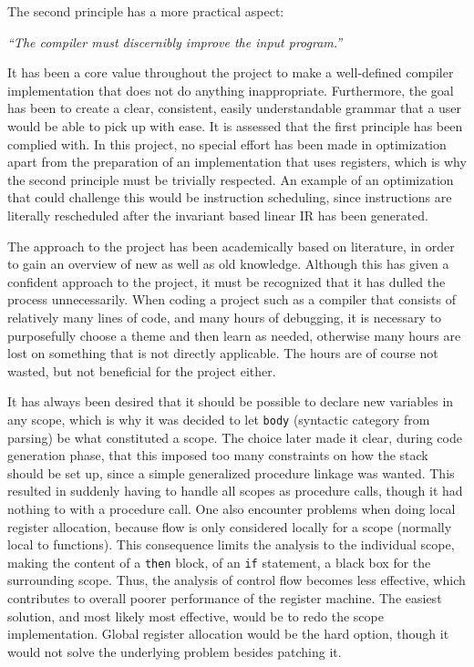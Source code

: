 The second principle has a more practical aspect:

\begin{displayquote}
    \textit{``The compiler must discernibly improve the input program.''}
\end{displayquote}
\hspace*{}

It has been a core value throughout the project to make a well-defined compiler implementation that does not do anything inappropriate. Furthermore, the goal has been to create a clear, consistent, easily understandable grammar that a user would be able to pick up with ease. It is assessed that the first principle has been complied with. In this project, no special effort has been made in optimization apart from the preparation of an implementation that uses registers, which is why the second principle must be trivially respected. An example of an optimization that could challenge this would be instruction scheduling, since instructions are literally rescheduled after the invariant based linear IR has been generated.

The approach to the project has been academically based on literature, in order to gain an overview of new as well as old knowledge. Although this has given a confident approach to the project, it must be recognized that it has dulled the process unnecessarily. When coding a project such as a compiler that consists of relatively many lines of code, and many hours of debugging, it is necessary to purposefully choose a theme and then learn as needed, otherwise many hours are lost on something that is not directly applicable. The hours are of course not wasted, but not beneficial for the project either.

It has always been desired that it should be possible to declare new variables in any scope, which is why it was decided to let \texttt{body} (syntactic category from parsing) be what constituted a scope. The choice later made it clear, during code generation phase, that this imposed too many constraints on how the stack should be set up, since a simple generalized procedure linkage was wanted. This resulted in suddenly having to handle all scopes as procedure calls, though it had nothing to with a procedure call. One also encounter problems when doing local register allocation, because flow is only considered locally for a scope (normally local to functions). This consequence limits the analysis to the individual scope, making the content of a \texttt{then} block, of an \texttt{if} statement, a black box for the surrounding scope. Thus, the analysis of control flow becomes less effective, which contributes to overall poorer performance of the register machine. The easiest solution, and most likely most effective, would be to redo the scope implementation. Global register allocation would be the hard option, though it would not solve the underlying problem besides patching it.

